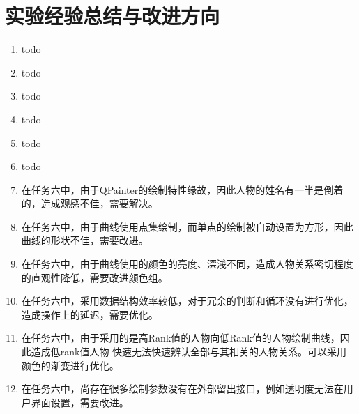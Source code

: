 \documentclass[a4paper,UTF8]{article}
\numberwithin{equation}{section}
\begin{document}
\section{实验经验总结与改进方向}
\begin{enumerate}[1)]
    \item todo
    \item todo
    \item todo
    \item todo
    \item todo
    \item todo
    \item 在任务六中，由于QPainter的绘制特性缘故，因此人物的姓名有一半是倒着的，造成观感不佳，需要解决。
    \item 在任务六中，由于曲线使用点集绘制，而单点的绘制被自动设置为方形，因此曲线的形状不佳，需要改进。
    \item 在任务六中，由于曲线使用的颜色的亮度、深浅不同，造成人物关系密切程度的直观性降低，需要改进颜色组。
    \item 在任务六中，采用数据结构效率较低，对于冗余的判断和循环没有进行优化，造成操作上的延迟，需要优化。
    \item 在任务六中，由于采用的是高Rank值的人物向低Rank值的人物绘制曲线，因此造成低rank值人物
    快速无法快速辨认全部与其相关的人物关系。可以采用颜色的渐变进行优化。
    \item 在任务六中，尚存在很多绘制参数没有在外部留出接口，例如透明度无法在用户界面设置，需要改进。
\end{enumerate}


\end{document}
